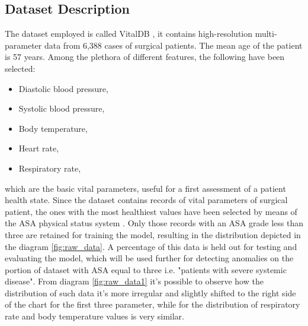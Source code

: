 \documentclass{article}
\begin{document}
\begin{multicols*}{2}
		\section{Dataset Description}
		\label{dataset}
		The dataset employed is called VitalDB \cite{VitalDB}, it contains high-resolution multi-parameter data from 6,388 cases of surgical patients. The mean age of the patient is 57 years.
		Among the plethora of different features, the following have been selected:
		\begin{itemize}
			\setlength\itemsep{-0.1em}
			\item Diastolic blood pressure,
			\item Systolic blood pressure,
			\item Body temperature,
			\item Heart rate,
			\item Respiratory rate,
		\end{itemize}
		which are the basic vital parameters, useful for a first assessment of a patient health state.
		Since the dataset contains records of vital parameters of surgical patient, the ones with the most healthiest values have been selected by means of the ASA physical status system \cite{ASA}.
		Only those records with an ASA grade less than three are retained for training the model, resulting in the distribution depicted in the diagram \ref{fig:raw_data}.
		A percentage of this data is held out for testing and evaluating the model, which will be used further for detecting anomalies on the portion of dataset with ASA equal to three i.e. "patients with severe systemic disease".
		From diagram \ref{fig:raw_data1} it's possible to observe how the distribution of such data it's more irregular and slightly shifted to the right side of the chart for the first three parameter, while for the distribution of respiratory rate and body temperature values is very similar.
		\begin{figure}[H]
			\centering

\end{figure}
\end{multicols*}
\end{document}
